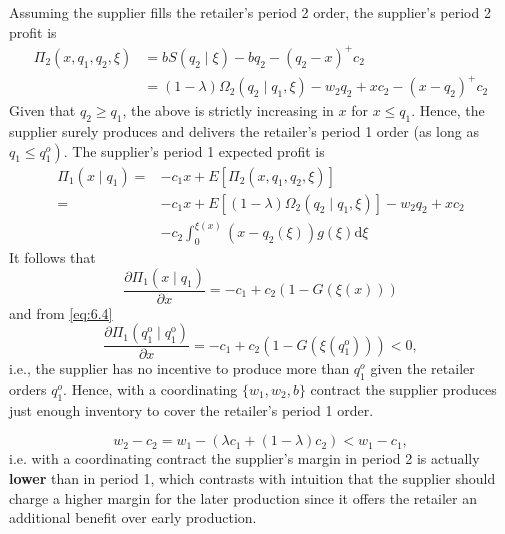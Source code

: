 Assuming the supplier fills the retailer's period 2 order, the supplier's period 2 profit is 
$$
\begin{aligned}
\Pi_{2}\left(x, q_{1}, q_{2}, \xi\right) &=b S\left(q_{2} \mid \xi\right)-b q_{2}-\left(q_{2}-x\right)^{+} c_{2} \\
&=(1-\lambda) \Omega_{2}\left(q_{2} \mid q_{1}, \xi\right)-w_{2} q_{2}+x c_{2}-\left(x-q_{2}\right)^{+} c_{2}
\end{aligned}
$$
Given that $q_{2} \geq q_{1}$, the above is strictly increasing in $x$ for $x \leq q_{1}$. Hence, the supplier surely produces and delivers the retailer's period 1 order (as long as $\left.q_{1} \leq q_{1}^{o}\right)$. The supplier's period 1 expected profit is
$$
\begin{aligned}
\Pi_{1}\left(x \mid q_{1}\right)=&-c_{1} x+E\left[\Pi_{2}\left(x, q_{1}, q_{2}, \xi\right)\right] \\
=&-c_{1} x+E\left[(1-\lambda) \Omega_{2}\left(q_{2} \mid q_{1}, \xi\right)\right]-w_{2} q_{2}+x c_{2} \\
&-c_{2} \int_{0}^{\xi(x)}\left(x-q_{2}(\xi)\right) g(\xi) \mathrm{d} \xi
\end{aligned}
$$
It follows that
$$
\frac{\partial \Pi_{1}\left(x \mid q_{1}\right)}{\partial x}=-c_{1}+c_{2}(1-G(\xi(x)))
$$
and from \autoref{eq:6.4}
$$
\frac{\partial \Pi_{1}\left(q_{1}^{\mathrm{o}} \mid q_{1}^{\mathrm{o}}\right)}{\partial x}=-c_{1}+c_{2}\left(1-G\left(\xi\left(q_{1}^{\mathrm{o}}\right)\right)\right)<0 ,
$$
i.e., the supplier has no incentive to produce more than $q_1^o$ given the retailer orders $q_1^o$. Hence, with a coordinating $\{w_1,w_2,b\}$ contract the supplier produces just enough inventory to cover the retailer's period 1 order. 
\begin{note}
    $$w_2-c_2=w_1-(\lambda c_1+(1-\lambda)c_2)<w_1-c_1,$$
    i.e. with a coordinating contract the supplier's margin in period 2 is actually \textbf{lower} than in period 1, which contrasts with intuition that the supplier should charge a higher margin for the later production since it offers the retailer an additional benefit over early production.
\end{note}



